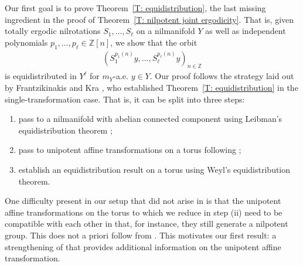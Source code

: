 \documentclass[11pt]{amsart}
\theoremstyle{definition}
\newcommand{\Z}{{\mathbb Z}}
\newcommand{\1}{{\mathbf{1}}}
\begin{document}
Our first goal is to prove Theorem~\ref{T: equidistribution}, the last missing ingredient in the proof of Theorem~\ref{T: nilpotent joint ergodicity}. That is, given totally ergodic nilrotations $S_1, \ldots, S_\ell$ on a nilmanifold $Y$  as well as independent polynomials $p_1, \ldots, p_\ell\in\Z[n]$, we show that the orbit 
\begin{align}\label{E: orbit}
         (S_1^{p_1(n)}y, \ldots, S_\ell^{p_\ell(n)}y)_{n\in\Z}
\end{align}
is equidistributed in $Y^\ell$ for $m_Y$-a.e. $y\in Y$.
Our proof follows the strategy laid out by Frantzikinakis and Kra \cite{FrKr05}, who established Theorem~\ref{T: equidistribution} in the single-transformation case. That is, it can be split into three steps:
\begin{enumerate}
    \item pass to a nilmanifold with abelian connected component using  Leibman's equidistribution theorem \cite{L05c, L05b};
    \item pass to unipotent affine transformations on a torus following \cite[Proposition~3.1]{FrKr05};
    \item establish an equidistribution result on a torus using Weyl's equidistribution theorem.
\end{enumerate}

One difficulty present in our setup that did not arise in \cite{FrKr05} is that the unipotent affine transformations on the torus to which we reduce in step (ii) need to be compatible with each other in that, for instance, they still generate a nilpotent group. This does not a priori follow from \cite{FrKr05}. This motivates our first result: a strengthening of \cite[Proposition~3.1]{FrKr05} that provides additional information on the unipotent affine transformation.
\end{document}
